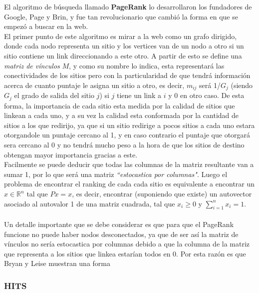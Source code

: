 El algoritmo de búsqueda llamado \textbf{PageRank} lo desarrollaron los fundadores de Google, Page y Brin, y fue tan revolucionario que cambió la forma en que se empezó a buscar en la web. \\
El primer punto de este algoritmo es mirar a la web como un grafo dirigido, donde cada nodo representa un sitio y los vertices van de un nodo a otro si un sitio contiene un link direccionando a este otro.
A partir de esto se define una \emph{matriz de vínculos} $M$, y como su nombre lo indica, esta representará las conectividades de los sitios pero con la particularidad de que tendrá información acerca de cuanto puntaje le asigna un sitio a otro, es decir, $m_{ij}$ será 1/$G_j$  (siendo $G_j$ el grado de salida del sitio $j$) si $j$ tiene un link a $i$ y 0 en otro caso.
De esta forma, la importancia de cada sitio esta medida por la calidad de sitios que linkean a cada uno, y a su vez la calidad esta conformada por la cantidad de sitios a los que redirijo, ya que si un sitio redirige a pocos sitios a cada uno estara otorgandole un puntaje cercano al 1, y en caso contrario el puntaje que otorgará sera cercano al 0 y no tendrá mucho peso a la hora de que los sitios de destino obtengan mayor importancia gracias a este.\\
Facilmente se puede deducir que todas las columnas de la matriz resultante van a sumar 1, por lo que será una matriz \textit{``estocastica por columnas"}. Luego el problema de encontrar el ranking de cada cada sitio es equivalente a encontrar un $x\in \mathbb{R}^n$ tal que $Px = x$, es decir, encontrar (suponiendo que existe) un autovector asociado al autovalor 1 de una matriz cuadrada, tal que $x_i \ge
0$ y $\sum_{i = 1}^n x_i = 1$. 
\\
\\
Un detalle importante que se debe considerar es que para que el PageRank funcione no puede haber nodos desconectados, ya que de ser así la matriz de vínculos no sería estocastica por columnas debido a que la columna de la matriz que representa a los sitios que linkea estarían todos en 0. Por esta razón es que Bryan y Leise \cite{Bryan2006} muestran una forma 

\subsubsection{HITS}

